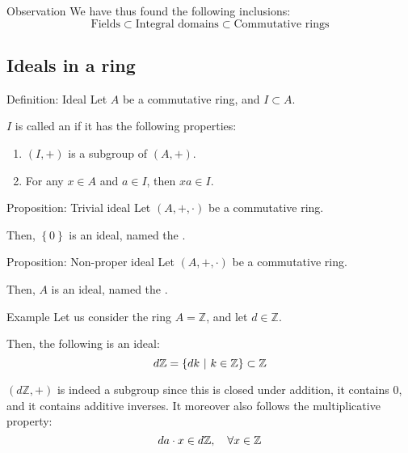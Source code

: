 \documentclass[a4paper]{article}
\begin{document}
\begin{parag}{Observation}
    We have thus found the following inclusions:
    \[\text{Fields} \subset \text{Integral domains} \subset \text{Commutative rings}\]
\end{parag}

\subsection{Ideals in a ring}

\begin{parag}{Definition: Ideal}
    Let $A$ be a commutative ring, and $I \subset A$.

    $I$ is called an  if it has the following properties:
    \begin{enumerate}
        \item $\left(I, +\right)$ is a subgroup of $\left(A, +\right)$.
        \item For any $x \in A$ and $a \in I$, then $xa \in I$.
    \end{enumerate}
\end{parag}

\begin{parag}{Proposition: Trivial ideal}
    Let $\left(A, +, \cdot \right)$ be a commutative ring.

    Then, $\left\{0\right\}$ is an ideal, named the .
\end{parag}

\begin{parag}{Proposition: Non-proper ideal}
    Let $\left(A, +, \cdot \right)$ be a commutative ring.

    Then, $A$ is an ideal, named the .
\end{parag}

\begin{parag}{Example}
    Let us consider the ring $A = \mathbb{Z}$, and let $d \in \mathbb{Z}$. 

    Then, the following is an ideal: 
    \[d\mathbb{Z} = \left\{dk \suchthat k \in \mathbb{Z}\right\} \subset \mathbb{Z}\]
    
    $\left(d\mathbb{Z}, +\right)$ is indeed a subgroup since this is closed under addition, it contains $0$, and it contains additive inverses. It moreover also follows the multiplicative property: 
    \[da \cdot  x \in d\mathbb{Z}, \quad \forall x \in \mathbb{Z}\]
\end{parag}
\end{document}
